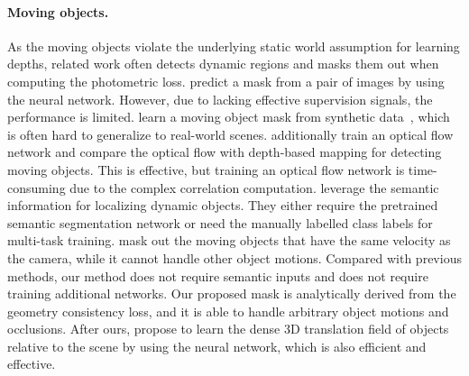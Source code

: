 \documentclass[twocolumn]{svjour3}
\renewcommand{\cite}[1]{\textcolor{blue}{\citep{#1}}}
\begin{document}
\paragraph{Moving objects.}
As the moving objects violate the underlying static world assumption for learning depths,
related work often detects dynamic regions and masks them out when computing the photometric loss.
\cite{zhou2017unsupervised} predict a mask from a pair of images by using the neural network.
However, due to lacking effective supervision signals, the performance is limited.
\cite{vijayanarasimhan2017sfm} learn a moving object mask from synthetic data~\cite{menze2015object},
which is often hard to generalize to real-world scenes.
\cite{yin2018geonet, zou2018df, ranjan2019cc, chen2019self} additionally train an optical flow network and compare the optical flow with depth-based mapping for detecting moving objects.
This is effective, but training an optical flow network is time-consuming due to the complex correlation computation.
\cite{casser2019struct2depth,gordon2019depth,packnet-semguided,huynh2020guiding,casser2019unsupervised} leverage the semantic information for localizing dynamic objects.
They either require the pretrained semantic segmentation network or need the manually labelled class labels for multi-task training.
\cite{monodepth2} mask out the moving objects that have the same velocity as the camera,
while it cannot handle other object motions.
Compared with previous methods, our method does not require semantic inputs and does not require training additional networks.
Our proposed mask is analytically derived from the geometry consistency loss,
and it is able to handle arbitrary object motions and occlusions.
After ours, \cite{li2020unsupervised} propose to learn the dense 3D translation field of objects relative to the scene by using the neural network,
which is also efficient and effective.
\end{document}
